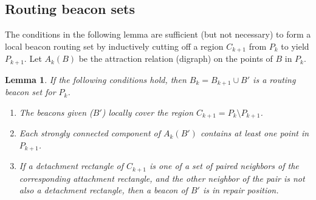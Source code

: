 \documentclass{article}
\newtheorem{lemma}{Lemma}
\begin{document}
\subsection{Routing beacon sets}\label{sec:routingset}
	
	The conditions in the following lemma are sufficient (but not
	necessary) to form a local beacon routing set by inductively cutting off
	a region $C_{k+1}$ from $P_k$ to yield $P_{k+1}$.  Let $A_k(B)$ be the
	attraction relation (digraph) on the points of $B$ in $P_{k}$.

	\begin{lemma}\label{lem:routingset}
		If the following conditions hold, then $B_k = B_{k+1} \cup B'$ is a
		routing beacon set for $P_k$.
		\begin{enumerate}
		  	\item The beacons given ($B'$) locally cover the region $C_{k+1} = P_k
		  	\setminus P_{k+1}$.
		  	\item Each strongly connected component of $A_k(B')$ contains at least
		  		one point in $P_{k+1}$.
		  	\item If a detachment rectangle of $C_{k+1}$ is one of a set of paired
		  	    neighbors of the corresponding attachment rectangle, and the other
		  	    neighbor of the pair is not also a detachment rectangle, then a beacon
		  	    of $B'$ is in repair position.
		\end{enumerate}
	\end{lemma}
	
\end{document}
